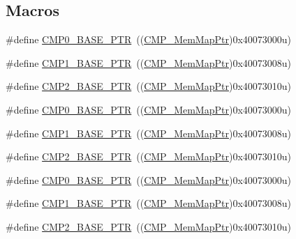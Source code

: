 \subsection*{Macros}
\begin{DoxyCompactItemize}
\item 
\#define \hyperlink{group___c_m_p___peripheral_ga5a7a6b1d0743a05435ba5cb2dc2b3431}{C\+M\+P0\+\_\+\+B\+A\+S\+E\+\_\+\+P\+TR}~((\hyperlink{group___c_m_p___peripheral_ga6f5d370df3839e41b771c2d0b89cbb83}{C\+M\+P\+\_\+\+Mem\+Map\+Ptr})0x40073000u)
\item 
\#define \hyperlink{group___c_m_p___peripheral_ga91e89d9d49a3f251dcd9026ad403a3e8}{C\+M\+P1\+\_\+\+B\+A\+S\+E\+\_\+\+P\+TR}~((\hyperlink{group___c_m_p___peripheral_ga6f5d370df3839e41b771c2d0b89cbb83}{C\+M\+P\+\_\+\+Mem\+Map\+Ptr})0x40073008u)
\item 
\#define \hyperlink{group___c_m_p___peripheral_ga732cbf43f95d2d1cd01b4204263940ab}{C\+M\+P2\+\_\+\+B\+A\+S\+E\+\_\+\+P\+TR}~((\hyperlink{group___c_m_p___peripheral_ga6f5d370df3839e41b771c2d0b89cbb83}{C\+M\+P\+\_\+\+Mem\+Map\+Ptr})0x40073010u)
\item 
\#define \hyperlink{group___c_m_p___peripheral_ga5a7a6b1d0743a05435ba5cb2dc2b3431}{C\+M\+P0\+\_\+\+B\+A\+S\+E\+\_\+\+P\+TR}~((\hyperlink{group___c_m_p___peripheral_ga6f5d370df3839e41b771c2d0b89cbb83}{C\+M\+P\+\_\+\+Mem\+Map\+Ptr})0x40073000u)
\item 
\#define \hyperlink{group___c_m_p___peripheral_ga91e89d9d49a3f251dcd9026ad403a3e8}{C\+M\+P1\+\_\+\+B\+A\+S\+E\+\_\+\+P\+TR}~((\hyperlink{group___c_m_p___peripheral_ga6f5d370df3839e41b771c2d0b89cbb83}{C\+M\+P\+\_\+\+Mem\+Map\+Ptr})0x40073008u)
\item 
\#define \hyperlink{group___c_m_p___peripheral_ga732cbf43f95d2d1cd01b4204263940ab}{C\+M\+P2\+\_\+\+B\+A\+S\+E\+\_\+\+P\+TR}~((\hyperlink{group___c_m_p___peripheral_ga6f5d370df3839e41b771c2d0b89cbb83}{C\+M\+P\+\_\+\+Mem\+Map\+Ptr})0x40073010u)
\item 
\#define \hyperlink{group___c_m_p___peripheral_ga5a7a6b1d0743a05435ba5cb2dc2b3431}{C\+M\+P0\+\_\+\+B\+A\+S\+E\+\_\+\+P\+TR}~((\hyperlink{group___c_m_p___peripheral_ga6f5d370df3839e41b771c2d0b89cbb83}{C\+M\+P\+\_\+\+Mem\+Map\+Ptr})0x40073000u)
\item 
\#define \hyperlink{group___c_m_p___peripheral_ga91e89d9d49a3f251dcd9026ad403a3e8}{C\+M\+P1\+\_\+\+B\+A\+S\+E\+\_\+\+P\+TR}~((\hyperlink{group___c_m_p___peripheral_ga6f5d370df3839e41b771c2d0b89cbb83}{C\+M\+P\+\_\+\+Mem\+Map\+Ptr})0x40073008u)
\item 
\#define \hyperlink{group___c_m_p___peripheral_ga732cbf43f95d2d1cd01b4204263940ab}{C\+M\+P2\+\_\+\+B\+A\+S\+E\+\_\+\+P\+TR}~((\hyperlink{group___c_m_p___peripheral_ga6f5d370df3839e41b771c2d0b89cbb83}{C\+M\+P\+\_\+\+Mem\+Map\+Ptr})0x40073010u)
\end{DoxyCompactItemize}
